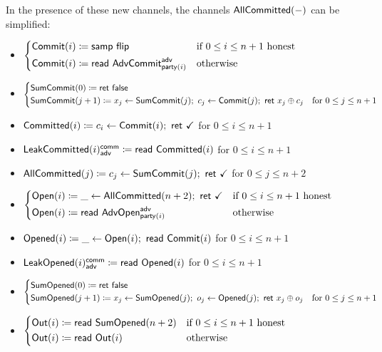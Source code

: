 \noindent In the presence of these new channels, the channels $\mathsf{AllCommitted}(-)$ can be simplified:

\begin{itemize}
\item {\color{blue} $\begin{cases*} \Commit(i) \coloneqq \samp{\flip} & \text{if $0 \leq i \leq n+1$ honest} \\ \Commit(i) \coloneqq \read{\AdvCommit^\adv_{\party(i)}} & \text{otherwise} \end{cases*}$}
\item {\color{blue} $\begin{cases*} \SumCommit(0) \coloneqq \ret{\false} & \\ \SumCommit(j+1) \coloneqq x_j \leftarrow \SumCommit(j); \ c_j \leftarrow \Commit(j); \ \ret{x_j \oplus c_j} & \text{for $0 \leq j \leq n+1$} \end{cases*}$}
\item {\color{magenta} $\mathsf{Committed}(i) \coloneqq c_i \leftarrow \mathsf{Commit}(i); \ \mathsf{ret} \ \checkmark$ for $0 \leq i \leq n+1$}
\item {\color{magenta} $\mathsf{LeakCommitted}(i)^{\mathsf{comm}}_{\mathsf{adv}} \coloneqq \mathsf{read} \ \mathsf{Committed}(i)$ for $0 \leq i \leq n+1$}
\item {\color{magenta} $\mathsf{AllCommitted}(j) \coloneqq c_j \leftarrow \mathsf{SumCommit}(j); \ \mathsf{ret} \ \checkmark$ for $0 \leq j \leq n+2$}
\item {\color{teal} $\begin{cases*} \Open(i) \coloneqq \_ \leftarrow \AllCommitted(n+2); \ \ret{\checkmark} & \text{if $0 \leq i \leq n+1$ honest} \\ \Open(i) \coloneqq \read{\AdvOpen^\adv_{\party(i)}} & \text{otherwise} \end{cases*}$}
\item {\color{red} $\mathsf{Opened}(i) \coloneqq \_ \leftarrow \mathsf{Open}(i); \ \mathsf{read} \ \mathsf{Commit}(i)$ for $0 \leq i \leq n+1$}
\item {\color{red} $\mathsf{LeakOpened}(i)^{\mathsf{comm}}_{\mathsf{adv}} \coloneqq \mathsf{read} \ \mathsf{Opened}(i)$ for $0 \leq i \leq n+1$}
\item {\color{red} $\begin{cases*} \SumOpened(0) \coloneqq \ret{\false} & \\ \SumOpened(j+1) \coloneqq x_j \leftarrow \SumOpened(j); \ o_j \leftarrow \Opened(j); \ \ret{x_j \oplus o_j} & \text{for $0 \leq j \leq n+1$} \end{cases*}$}
\item $\begin{cases*} \Out(i) \coloneqq \read{\SumOpened(n+2)} & \text{if $0 \leq i \leq n+1$ honest} \\ \Out(i) \coloneqq \read{\Out(i)} & \text{otherwise} \end{cases*}$
\end{itemize}

